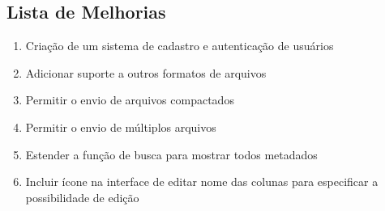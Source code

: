 
\begin{apendicesenv}
\partapendices






\chapter{Lista de Melhorias}
\label{apendiceB}

\begin{enumerate}  
    \item Criação de um sistema de cadastro e autenticação de usuários 
    \item Adicionar suporte a outros formatos de arquivos 
    \item Permitir o envio de arquivos compactados
    \item Permitir o envio de múltiplos arquivos
    \item Estender a função de busca para mostrar todos metadados
    \item Incluir ícone na interface de editar nome das colunas para especificar a possibilidade de edição
\end{enumerate}

\end{apendicesenv}
